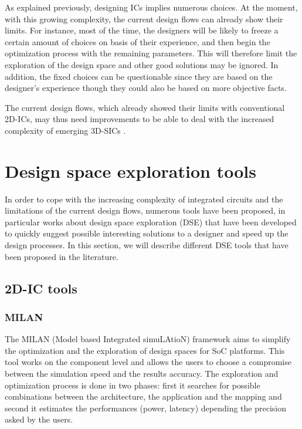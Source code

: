As explained previously, designing ICs implies numerous choices. At the moment, with this growing complexity, the current design flows can already show their limits. For instance, most of the time, the designers will be likely to freeze a certain amount of choices on basis of their experience, and then begin the optimization process with the remaining parameters. This will therefore limit the exploration of the design space and other good solutions may be ignored. In addition, the fixed choices can be questionable since they are based on the designer's experience though they could also be based on more objective facts.

The current design flows, which already showed their limits with conventional 2D-ICs, may thus need improvements to be able to deal with the increased complexity of emerging 3D-SICs \cite{vanderbiest06, PFF10}.

\section{Design space exploration tools}

In order to cope with the increasing complexity of integrated circuits and the limitations of the current design flows, numerous tools have been proposed, in particular works about design space exploration (DSE) that have been developed to quickly suggest possible interesting solutions to a designer and speed up the design processes. In this section, we will describe different DSE tools that have been proposed in the literature.

\subsection{2D-IC tools}

\subsubsection{MILAN}

The MILAN (Model based Integrated simuLAtioN) framework \cite{Mohanty02rapidsystem-level} aims to simplify the optimization and the exploration of design spaces for SoC platforms. This tool works on the component level and allows the users to choose a compromise between the simulation speed and the results accuracy. The exploration and optimization process is done in two phases: first it searches for possible combinations between the architecture, the application and the mapping and second it estimates the performances (power, latency) depending the precision asked by the users.

